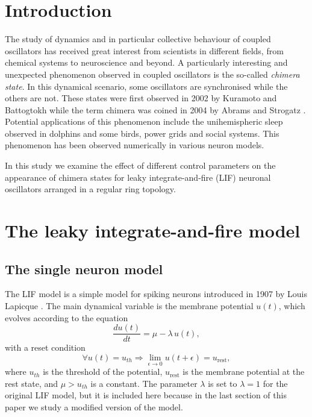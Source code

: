 \documentclass[a4paper,12pt]{article}
\begin{document}
\section{Introduction}
The study of dynamics and in particular collective behaviour of coupled oscillators has received great interest from scientists in different fields, from chemical systems to neuroscience and beyond. A particularly interesting and unexpected phenomenon observed in coupled oscillators is the so-called \textit{chimera state}. In this dynamical scenario, some oscillators are synchronised while the others are not. These states were first observed in 2002 by Kuramoto and Battogtokh \cite{kuramoto} while the term chimera was coined in 2004 by Abrams and Strogatz \cite{stro}. Potential applications of this phenomenon include the unihemispheric sleep observed in dolphins and some birds, power grids and social systems. This phenomenon has been observed numerically in various neuron models.
\par In this study we examine the effect of different control parameters on the appearance of chimera states for leaky integrate-and-fire (LIF) neuronal oscillators arranged in a regular ring topology. 

\section{The leaky integrate-and-fire model}
\subsection{The single neuron model}
The LIF model is a simple model for spiking neurons introduced in 1907 by Louis Lapicque \cite{tsigkrimulti}. The main dynamical variable is the membrane potential $u(t)$, which evolves according to the equation
\begin{equation} \label{eq1}
\frac{d u(t)}{dt} = \mu - \lambda \, u(t),
\end{equation}
with a reset condition
\begin{equation} \label{eq2}
\forall u(t) = u_{th} \Rightarrow \lim_{\epsilon \rightarrow 0} u(t + \epsilon) = u_{\text{rest}}, 
\end{equation}
where $u_{th}$ is the threshold of the potential, $u_{\text{rest}}$ is the membrane potential at the rest state, and $\mu > u_{th}$ is a constant. The parameter $\lambda$ is set to $\lambda=1$ for the original LIF model, but it is included here because in the last section of this paper we study a modified version of the model. 
\end{document}
